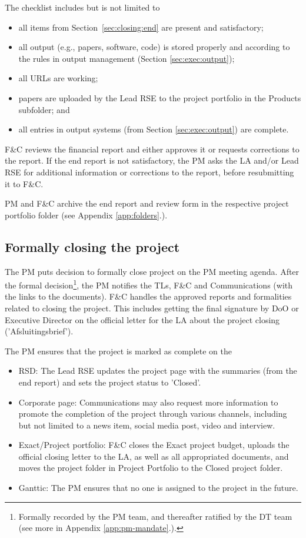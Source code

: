 The checklist includes but is not limited to
\begin{itemize}
\item all items from Section~\ref{sec:closing:end} are present and satisfactory;
\item all output (e.g., papers, software, code) is stored properly and according to the rules in output management (Section
\ref{sec:exec:output});
\item all URLs are working;
\item papers are uploaded by the Lead RSE to the project portfolio in the Products subfolder; and
\item all entries in output systems (from Section \ref{sec:exec:output}) are complete.
\end{itemize}

F\&C reviews the financial report and either approves it or requests corrections to the report. If the end report is not
satisfactory, the PM asks the LA and/or Lead RSE for additional information or corrections to the report, before
resubmitting it to F\&C. 

PM and F\&C archive the end report and review form in the respective project portfolio folder (see Appendix
\ref{app:folders}.).

\subsection{Formally closing the project}
The PM puts decision to formally close project on the PM meeting agenda. After the formal decision\footnote{Formally
recorded by the PM team, and thereafter ratified by the DT team (see more in Appendix \ref{app:pm-mandate}.).}, the PM
notifies the TLs, F\&C and Communications (with the links to the documents). F\&C handles the approved reports and
formalities related to closing the project. This includes getting the final signature by DoO or Executive Director on
the official letter for the LA about the project closing ('Afsluitingsbrief').


The PM ensures that the project is marked as complete on the 
\begin{itemize}
\item RSD: The Lead RSE updates the project page with the summaries (from the end report) and sets the project status to
'Closed'. 
\item Corporate page: Communications may also request more information to promote the completion of the project through
various channels, including but not limited to a news item, social media post, video and interview.
\item Exact/Project portfolio: F\&C closes the Exact project budget, uploads the official closing letter to the LA, as well as
all appropriated documents, and moves the project folder in Project Portfolio to the Closed project folder.
\item Ganttic: The PM ensures that no one is assigned to the project in the future.
\end{itemize}
